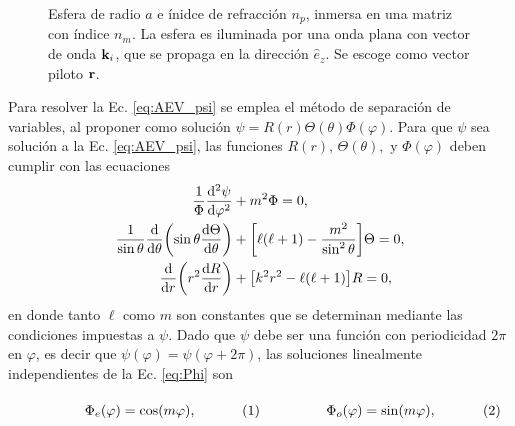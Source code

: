 \begin{figure}[h!]
		\caption{ Esfera de radio $a$ e ínidce de refracción $n_p$, inmersa en una matriz con índice $n_m$. La esfera es iluminada por una onda plana con vector de onda $\vb{k}_i$, que se propaga en la dirección $\hat{e}_z$. Se escoge como vector piloto $\vb{r}$.}\label{fig:EsferaA}
	\end{figure}	
	
Para resolver la Ec. \eqref{eq:AEV_psi} se emplea el método de separación de variables, al proponer como solución $\psi= R(r)\Theta(\theta) \Phi(\varphi)$. Para que $\psi$ sea solución a la Ec.  \eqref{eq:AEV_psi}, las funciones $R(r),\, \Theta(\theta), \mbox{ y } \Phi(\varphi)$ deben cumplir con las ecuaciones
	\begin{align}
	\frac{1}{\Phi}\dv[2]{\psi}{\varphi} &+ m^2 \Phi =0, \label{eq:Phi}\\
	\frac{1}{\sin\theta}\dv{\theta}\qty(\sin\theta\dv{\Theta}{\theta}) &+ 	\qty[\ell(\ell+1)- \frac{m^2}{\sin^2\theta}]\Theta =0,\label{eq:Theta}\\
	\dv{r}\qty(r^2\dv{R}{r}) &+ \qty[ k^2 r^2 - \ell (\ell +1)] R =0, 	\label{eq:Req}
	\end{align}
en donde tanto $\ell$  como $m$ son constantes que se determinan mediante las condiciones impuestas a $\psi$. Dado que $\psi$ debe ser una función con periodicidad $2\pi$ en $\varphi$, es decir que $\psi(\varphi) = \psi(\varphi+2\pi)$, las soluciones linealmente independientes de la Ec. \eqref{eq:Phi} son 

	\begin{subequations}
	\eqhalf{\Phi_e(\varphi) = \cos(m\varphi),}
	\eqhalf{\Phi_o(\varphi) = \sin(m\varphi),}
	\label{eq:SinCos} 
	\end{subequations} \vspace{-1em}
	
